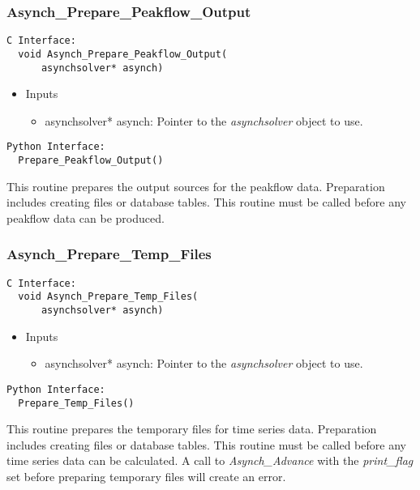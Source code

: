 \documentclass[12pt]{article}
\begin{document}
\subsubsection{Asynch\_Prepare\_Peakflow\_Output} \label{sec: asynch_prepare_peakflow_output}

\begin{lstlisting}[style=CStyle]
  C Interface:
  void Asynch_Prepare_Peakflow_Output(
      asynchsolver* asynch)
\end{lstlisting}
\begin{itemize}
 \item Inputs
  \begin{itemize}
   \item asynchsolver* asynch: Pointer to the \emph{asynchsolver} object to use.
  \end{itemize}
\end{itemize}
\begin{lstlisting}[style=PythonStyle]
  Python Interface:
  Prepare_Peakflow_Output()
\end{lstlisting}
This routine prepares the output sources for the peakflow data. Preparation includes creating files or database tables. This routine must be called before any peakflow data can be produced.


\subsubsection{Asynch\_Prepare\_Temp\_Files} \label{sec: asynch_prepare_temp_files}

\begin{lstlisting}[style=CStyle]
  C Interface:
  void Asynch_Prepare_Temp_Files(
      asynchsolver* asynch)
\end{lstlisting}
\begin{itemize}
 \item Inputs
  \begin{itemize}
   \item asynchsolver* asynch: Pointer to the \emph{asynchsolver} object to use.
  \end{itemize}
\end{itemize}
\begin{lstlisting}[style=PythonStyle]
  Python Interface:
  Prepare_Temp_Files()
\end{lstlisting}
This routine prepares the temporary files for time series data. Preparation includes creating files or database tables. This routine must be called before any time series data can be calculated. A call to \emph{Asynch\_Advance} with the \emph{print\_flag} set before preparing temporary files will create an error.
\end{document}

